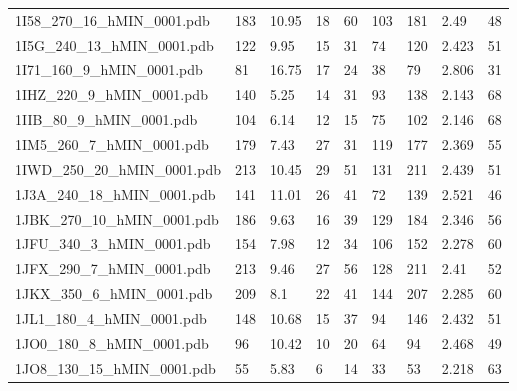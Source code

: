 \documentclass{bioinfo}
\begin{document}
\begin{table}[!t]
{\begin{tabular}{lllllllll}
    1I58\_270\_16\_hMIN\_0001.pdb & 183      & 10.95      & 18          & 60          & 103         & 181     & 2.49            & 48           \\
    1I5G\_240\_13\_hMIN\_0001.pdb & 122      & 9.95       & 15          & 31          & 74          & 120     & 2.423           & 51           \\
    1I71\_160\_9\_hMIN\_0001.pdb & 81       & 16.75      & 17          & 24          & 38          & 79      & 2.806           & 31           \\
    1IHZ\_220\_9\_hMIN\_0001.pdb & 140      & 5.25       & 14          & 31          & 93          & 138     & 2.143           & 68           \\
    1IIB\_80\_9\_hMIN\_0001.pdb & 104      & 6.14       & 12          & 15          & 75          & 102     & 2.146           & 68           \\
    1IM5\_260\_7\_hMIN\_0001.pdb & 179      & 7.43       & 27          & 31          & 119         & 177     & 2.369           & 55           \\
    1IWD\_250\_20\_hMIN\_0001.pdb & 213      & 10.45      & 29          & 51          & 131         & 211     & 2.439           & 51           \\
    1J3A\_240\_18\_hMIN\_0001.pdb & 141      & 11.01      & 26          & 41          & 72          & 139     & 2.521           & 46           \\
    1JBK\_270\_10\_hMIN\_0001.pdb & 186      & 9.63       & 16          & 39          & 129         & 184     & 2.346           & 56           \\
    1JFU\_340\_3\_hMIN\_0001.pdb & 154      & 7.98       & 12          & 34          & 106         & 152     & 2.278           & 60           \\
    1JFX\_290\_7\_hMIN\_0001.pdb & 213      & 9.46       & 27          & 56          & 128         & 211     & 2.41            & 52           \\
    1JKX\_350\_6\_hMIN\_0001.pdb & 209      & 8.1        & 22          & 41          & 144         & 207     & 2.285           & 60           \\
    1JL1\_180\_4\_hMIN\_0001.pdb & 148      & 10.68      & 15          & 37          & 94          & 146     & 2.432           & 51           \\
    1JO0\_180\_8\_hMIN\_0001.pdb & 96       & 10.42      & 10          & 20          & 64          & 94      & 2.468           & 49           \\
    1JO8\_130\_15\_hMIN\_0001.pdb & 55       & 5.83       & 6           & 14          & 33          & 53      & 2.218           & 63           \\

\end{tabular}}
\end{table}
\end{document}
